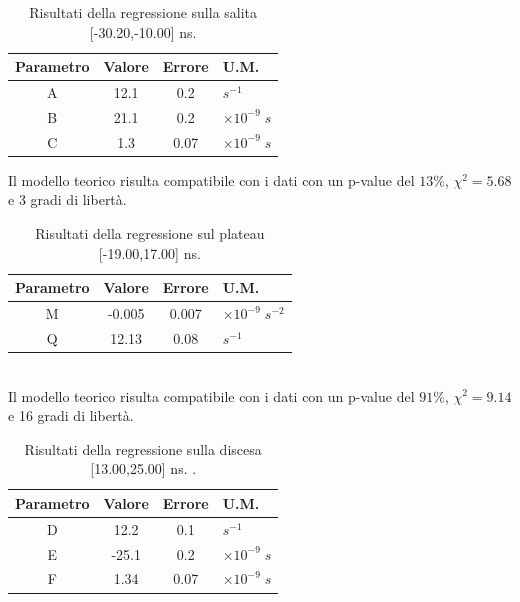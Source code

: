 \documentclass[11pt]{article} %
\begin{document}
\begin{table}[!h]
\begin{center}
\begin{tabular}{|c|c|c|l|}
\hline
\multicolumn{1}{|l|}{Parametro} & \multicolumn{1}{l|}{Valore} & \multicolumn{1}{l|}{Errore} & U.M. \\ \hline
A                               & 12.1                       & 0.2                      & $s^{-1}$     \\ \hline
B                               & 21.1                        & 0.2                           & $\times10^{-9}\;s$    \\ \hline
C                               & 1.3                          & 0.07                          &  $\times10^{-9}\;s$    \\ \hline
\end{tabular}
\end{center}
\caption{Risultati della regressione sulla salita [-30.20,-10.00] ns.}
\end{table}
Il modello teorico risulta compatibile con i dati con un p-value del $13\%$, $\chi ^2=5.68$ e 3 gradi di libertà.
\begin{table}[!h]
\begin{center}
\begin{tabular}{|c|c|c|l|}
\hline
\multicolumn{1}{|l|}{Parametro} & \multicolumn{1}{l|}{Valore} & \multicolumn{1}{l|}{Errore} & U.M. \\ \hline
M                               & -0.005                       & 0.007                 & $\times 10^{-9}\;s^{-2}$     \\ \hline
Q                               & 12.13                      & 0.08                           & $s^{-1}$    \\ \hline
\end{tabular}
\end{center}
\caption{Risultati della regressione sul plateau  [-19.00,17.00] ns.}
\end{table}
\\Il modello teorico risulta compatibile con i dati con un p-value del $91\%$, $\chi ^2=9.14$ e 16 gradi di libertà.
\begin{table}[!h]
\begin{center}
\begin{tabular}{|c|c|c|l|}
\hline
\multicolumn{1}{|l|}{Parametro} & \multicolumn{1}{l|}{Valore} & \multicolumn{1}{l|}{Errore} & U.M. \\ \hline
D                               & 12.2                       & 0.1                       &    $s^{-1}$  \\ \hline
E                               & -25.1                       & 0.2                           & $\times10^{-9}\;s$    \\ \hline
F                               & 1.34                          & 0.07                           & $\times10^{-9}\;s$    \\ \hline
\end{tabular}
\end{center}
\caption{Risultati della regressione sulla discesa [13.00,25.00] ns. .}
\end{table}
\end{document}
